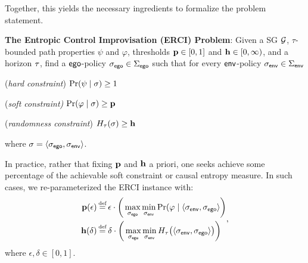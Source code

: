 {{{Together, this yields the necessary ingredients to formalize the problem statement. 
\begin{mdframed}[backgroundcolor=blue!5]
\textbf{The Entropic Control Improvisation (ERCI) Problem}:
Given a SG $\mathcal{G}$, $\tau$-bounded path properties $\psi$ and $\varphi$, thresholds $\mathbf{p} \in [0,1]$ and $\mathbf{h} \in [0,\infty)$, and a horizon $\tau$,  find a $\mathsf{ego}$-policy ${\sigma_{\mathsf{ego}}} \in \Sigma_{\mathsf{ego}}$  such that for every $\mathsf{env}$-policy ${\sigma_{\mathsf{env}}} \in \Sigma_{\mathsf{env}}$ \begin{compactenum}
	\item (\emph{hard constraint}) $\Pr(\psi \mid \sigma) \geq 1$
	\item (\emph{soft constraint)} $\Pr(\varphi \mid \sigma) \geq \mathbf{p}$
\item (\emph{randomness constraint}) $H_\tau(\sigma) \geq \mathbf{h}$
\end{compactenum}
where  $\sigma = \langle {\sigma_{\mathsf{ego}}}, {\sigma_{\mathsf{env}}} \rangle$.
\end{mdframed}
\begin{remark}
  In practice, rather that fixing $\mathbf{p}$ and $\mathbf{h}$ a
  priori, one seeks achieve some percentage of the achievable soft
  constraint or causal entropy measure.  In such cases, we
  re-parameterized the ERCI instance with:
  \begin{equation}
    \begin{split}
      \scthreshold(\epsilon) &\eqdef \epsilon \cdot \bigg (\max_{\pOneSched} \min_{\pTwoSched} \Pr(\varphi \mid \langle \pTwoSched, \pOneSched \rangle\bigg)\\
      \randomness(\delta) &\eqdef  \delta \cdot \bigg(\max_{\pOneSched}
      \min_{\pTwoSched} H_\tau\big (\langle \pTwoSched, \pOneSched
      \rangle \big )\bigg)
    \end{split},
  \end{equation}
  where $\epsilon, \delta \in [0, 1]$.
\end{remark}

\begin{figure}
\centering
\begin{subfigure}{0.2\columnwidth}
\centering
{}
\end{subfigure}
\end{figure}}}}
